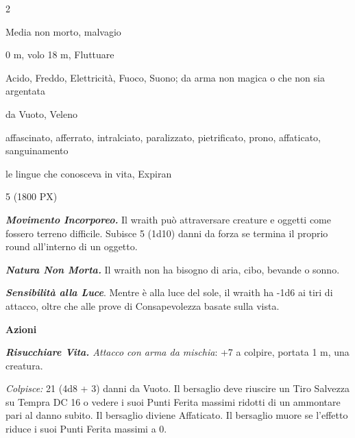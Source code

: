 \begin{multicols}{2}
{
\begin{description}[noitemsep, topsep=0pt, parsep=0pt, partopsep=0pt, itemsep=1pt, leftmargin=2.35cm,  labelwidth=2.2cm, itemindent=0cm, listparindent=0pt] %
\setlength{\baselineskip}{10pt}
\item[\textbf{Taglia/Tipo}] Media non morto, malvagio
\item[\textbf{Caratt.}] 
\item[\textbf{Punti Ferita}] 
\item[\textbf{Movimento}] 0 m, volo 18 m, Fluttuare
\item[\textbf{Tiri Salvez.}] 
\item[\textbf{Res. Danni}] Acido, Freddo, Elettricità, Fuoco, Suono; da arma non magica o che non sia argentata
\item[\textbf{Imm. Danni}] da Vuoto, Veleno
\item[\textbf{Immunità}] affascinato, afferrato, intralciato, paralizzato, pietrificato, prono, affaticato, sanguinamento
\item[\textbf{Sensi}] 
\item[\textbf{Linguaggi}] le lingue che conosceva in vita, Expiran
\item[\textbf{Sfida}] 5 (1800 PX)
\end{description}
\smallskip

\emph{\textbf{Movimento Incorporeo.}} Il wraith può attraversare creature e oggetti come fossero terreno difficile. Subisce 5 (1d10) danni da forza se termina il proprio round all'interno di un oggetto.

\emph{\textbf{Natura Non Morta.}} Il wraith non ha bisogno di aria, cibo, bevande o sonno.

\emph{\textbf{Sensibilità alla Luce}}. Mentre è alla luce del sole, il wraith ha -1d6 ai tiri di attacco, oltre che alle prove di Consapevolezza basate sulla vista.

\textbf{Azioni}

\emph{\textbf{Risucchiare Vita.} Attacco con arma da mischia}: +7 a colpire, portata 1 m, una creatura.

\emph{Colpisce:} 21 (4d8 + 3) danni da Vuoto. Il bersaglio deve riuscire un Tiro Salvezza su Tempra DC 16 o vedere i suoi Punti Ferita massimi ridotti di un ammontare pari al danno subito. Il bersaglio diviene Affaticato. Il bersaglio muore se l'effetto riduce i suoi Punti Ferita massimi a 0.

}
\end{multicols}
